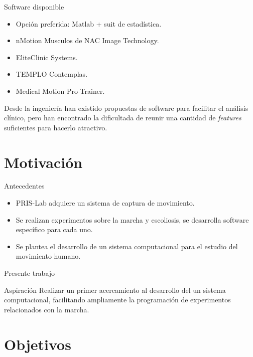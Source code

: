 \documentclass{beamer} %
\begin{document}
\begin{frame}{Software disponible}
    \begin{itemize}
        \item Opción preferida: Matlab + suit de estadística.
        \item nMotion Musculos de NAC Image Technology.
        \item EliteClinic Systems. 
        \item TEMPLO Contemplas.
        \item Medical Motion Pro-Trainer.
    \end{itemize}
    \begin{block}{}
        Desde la ingeniería han existido propuestas de software para facilitar el análisis clínico, pero han encontrado la dificultada de reunir una cantidad de \emph{features} suficientes para hacerlo atractivo. 
    \end{block}
\end{frame}


\section{Motivación}

\begin{frame}{Antecedentes}
    \begin{itemize}
        \item PRIS-Lab adquiere un sistema de captura de movimiento.
        \item Se realizan experimentos sobre la marcha y escoliosis, se desarrolla software específico para cada uno.
        \item Se plantea el desarrollo de un sistema computacional para el estudio del movimiento humano.
    \end{itemize}
\end{frame}

\begin{frame}{Presente trabajo}
    \begin{block}{Aspiración} 
        Realizar un primer acercamiento al desarrollo del un sistema computacional, facilitando ampliamente la programación de experimentos relacionados con la marcha. 
    \end{block}
\end{frame}


\section{Objetivos}
\end{document}
